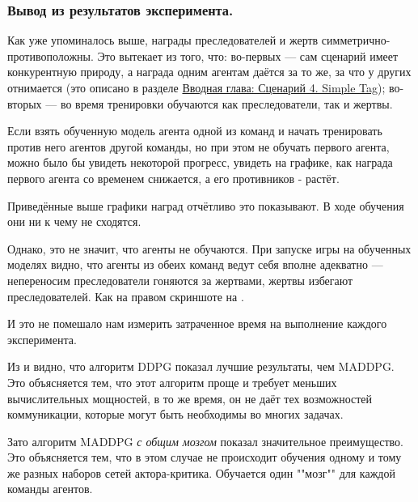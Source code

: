 \subsubsection{Вывод из результатов эксперимента.}

Как уже упоминалось выше, награды преследователей и жертв симметрично-противоположны. Это вытекает из того, что: во-первых --- сам сценарий имеет конкурентную природу, а награда одним агентам даётся за то же, за что у других отнимается (это описано в разделе \hyperref[intro-st]{Вводная глава: Сценарий 4. Simple Tag}); во-вторых --- во время тренировки обучаются как преследователи, так и жертвы.

Если взять обученную модель агента одной из команд и начать тренировать против него агентов другой команды, но при этом не обучать первого агента, можно было бы увидеть некоторой прогресс, увидеть на графике, как награда первого агента со временем снижается, а его противников - растёт.

Приведённые выше графики наград отчётливо это показывают. В ходе обучения они ни к чему не сходятся.

Однако, это не значит, что агенты не обучаются. При запуске игры на обученных моделях видно, что агенты из обеих команд ведут себя вполне адекватно --- $не переносим$ преследователи гоняются за жертвами, жертвы избегают преследователей. Как на правом скриншоте на .

И это не помешало нам измерить затраченное время на выполнение каждого эксперимента.

Из  и  видно, что алгоритм DDPG показал лучшие результаты, чем MADDPG. Это объясняется тем, что этот алгоритм проще и требует меньших вычислительных мощностей, в то же время, он не даёт тех возможностей коммуникации, которые могут быть необходимы во многих задачах.

Зато алгоритм MADDPG \textit{с общим мозгом} показал значительное преимущество. Это объясняется тем, что в этом случае не происходит обучения одному и тому же разных наборов сетей актора-критика. Обучается один ""мозг"" для каждой команды агентов. %
